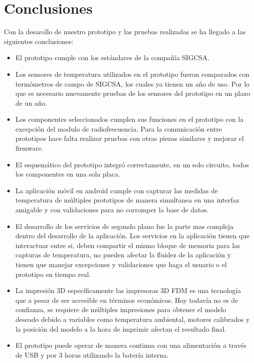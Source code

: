 \section{Conclusiones}

\par \noindent
Con la desarollo de nuestro prototipo y las pruebas realizadas se ha llegado a las siguientes conclusiones:

\begin{itemize}
	
	\item El prototipo cumple con los estándares de la compañía SIGCSA. 
	
	\item Los sensores de temperatura utilizados en el prototipo fueron comparados con termómetros de campo de SIGCSA, los cuales ya tienen un año de uso. Por lo que es necesario nuevamente pruebas de los sensores del prototipo en un plazo de un año.
	
	\item Los componentes seleccionados cumplen sus funciones en el prototipo con la excepción del modulo de radiofrecuencia. Para la comunicación entre prototipos hace falta realizar pruebas con otras piezas similares y mejorar el firmware.
	
	\item El esquemático del prototipo integró correctamente, en un solo circuito, todos los componentes en una sola placa.
	
	\item La aplicación móvil en android cumple con capturar las medidas de temperatura de múltiples prototipos de manera simultanea en una interfaz amigable y con validaciones para no corromper la base de datos.
	
	\item El desarrollo de los servicios de segundo plano fue la parte mas compleja dentro del desarrollo de la aplicación. Los servicios en la aplicación tienen que interactuar entre si, deben compartir el mismo bloque de memoria para las capturas de temperatura, no pueden afectar la fluidez de la aplicación y tienen que manejar excepciones y validaciones que haga el usuario o el prototipo en tiempo real.
	
	\item La impresión 3D específicamente las impresoras 3D FDM es una tecnología que a pesar de ser accesible en términos económicos. Hoy todavía no es de confianza, se requiere de múltiples impresiones para obtener el modelo deseado debido a variables como temperatura ambiental, motores calibrados y la posición del modelo a la hora de imprimir afectan el resultado final.
	
	\item El prototipo puede operar de manera continua con una alimentación a través de USB y por 3 horas utilizando la batería interna.
	
\end{itemize}